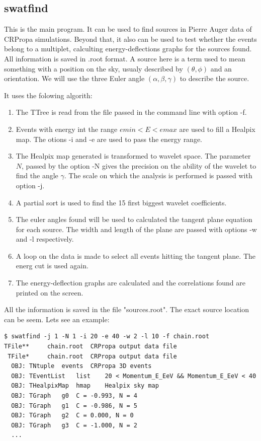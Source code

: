 \documentclass[12pt]{article}
\begin{document}
\subsection{swatfind}
This is the main program. It can be used to find sources in Pierre Auger data
of CRPropa simulations. Beyond that, it also can be used to test whether the
events belong to a multiplet, calculting energy-deflections graphs for the
sources found. All information is saved in .root format. A source here is a
term used to mean something with a position on the sky, usualy described by
$(\theta,\phi)$ and an orientation. We will use the three Euler angle
$(\alpha,\beta,\gamma)$ to describe the source. 

It uses the folowing algorith:
\begin{enumerate}
\item The TTree is read from the file passed in the command line with option -f.
\item Events with energy int the range $emin < E < emax$ are used to fill a Healpix map.
The otions -i and -e are used to pass the energy range.
\item The Healpix map generated is transformed to wavelet space. The parameter $N$,
passed by the option -N gives the precision on the ability of the wavelet to find 
the angle $\gamma$. The scale on which the analysis is performed is passed with option -j. 
\item A partial sort is used to find the 15 first biggest wavelet coefficients.
\item The euler angles found will be used to calculated the tangent plane equation for each
source. The width and length of the plane are passed with options -w and -l respectively.
\item A loop on the data is made to select all events hitting the tangent plane. The energ cut
is used again.
\item The energy-deflection graphs are calculated and the correlations found are 
printed on the screen.
\end{enumerate}
All the information is saved in the file {\color{brown}"sources.root"}. The exact
source location can be seem. Lets see an example:

{ \color{brown}
\begin{lstlisting}
$ swatfind -j 1 -N 1 -i 20 -e 40 -w 2 -l 10 -f chain.root
TFile**		chain.root	CRPropa output data file
 TFile*		chain.root	CRPropa output data file
  OBJ: TNtuple	events	CRPropa 3D events
  OBJ: TEventList	list	20 < Momentum_E_EeV && Momentum_E_EeV < 40 
  OBJ: THealpixMap	hmap	Healpix sky map
  OBJ: TGraph	g0	C = -0.993, N = 4
  OBJ: TGraph	g1	C = -0.986, N = 5
  OBJ: TGraph	g2	C = 0.000, N = 0
  OBJ: TGraph	g3	C = -1.000, N = 2
  ...
\end{lstlisting}
}
\end{document}

